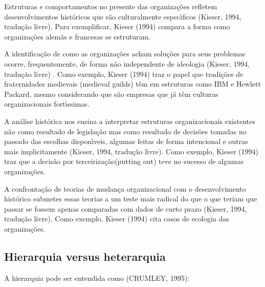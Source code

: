 \documentclass[
12pt,		%
openright,	%
twoside,  %
a4paper,			%
chapter=TITLE,		%
english,			%
french,				%
spanish,			%
brazil				%
]{USPSC-classe/USPSC}
\begin{document}
\begin{alineas}
\item Estruturas e comportamentos no presente das organiza\c{c}\~oes refletem desenvolvimentos hist\'oricos que s\~ao culturalmente espec\'{\i}ficos  (Kieser, 1994, tradu\c{c}\~ao livre). Para exemplificar,  Kieser (1994) compara a forma como organiza\c{c}\~oes alem\~as e francesas se estruturam.
\item A identifica\c{c}\~ao de como as organiza\c{c}\~oes acham solu\c{c}\~oes para seus problemas ocorre, frequentemente, de forma n\~ao independente de ideologia  (Kieser, 1994, tradu\c{c}\~ao livre) . Como exemplo,  Kieser (1994) traz o papel  que tradi\c{c}\~oes de fraternidades medievais (medieval guilds) t\^em em estruturas como IBM e Hewlett Packard, mesmo considerando que s\~ao empresas que j\'a t\^em culturas organizacionais fort\'{\i}ssimas.
\item A an\'alise hist\'orica nos ensina a interpretar estruturas organizacionais existentes n\~ao como resultado de legisla\c{c}\~ao mas como resultado de decis\~oes tomadas no passado das escolhas dispon\'{\i}veis, algumas feitas de forma intencional e outras mais implicitamente  (Kieser, 1994, tradu\c{c}\~ao livre). Como exemplo,  Kieser (1994) traz que a decis\~ao por \textquotedbl terceiriza\c{c}\~ao\textquotedbl  (putting out) teve no sucesso de algumas organiza\c{c}\~oes.
\item A confronta\c{c}\~ao de teorias de mudan\c{c}a organizacional com o desenvolvimento hist\'orico submetes essas teorias a um teste mais radical do que o que teriam que passar se fossem apenas comparadas com dados de curto prazo (Kieser, 1994, tradu\c{c}\~ao livre). Como exemplo,  Kieser (1994) cita casos de ecologia das organiza\c{c}\~oes.
\end{alineas}

\subsection[Hierarquia versus heterarquia]{Hierarquia versus heterarquia}\label{Hierarquia versus heterarquia}
A hierarquia pode ser entendida como (CRUMLEY, 1995):










\noindent\begin{center}\mbox{\centering{}}\end{center}
\end{document}
